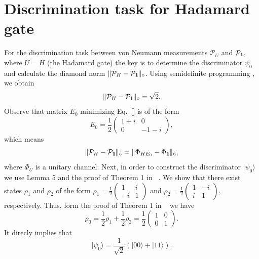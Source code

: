 \documentclass[preprint,12pt, a4paper, dvipsnames]{elsarticle}
\newcommand{\ket}[1]{\ensuremath{|#1\rangle}}
\newcommand{\1}{{\rm 1\hspace{-0.9mm}l}}
\newcommand{\Id}{{\rm 1\hspace{-0.9mm}l}}
\newcommand{\PP}{\mathcal{P}}
\begin{document}
\section{Discrimination task for Hadamard gate}\label{app:hadamard}
For the discrimination task between von Neumann measurements $\PP_{U}$ and $\PP_\Id$, where $U = H$ (the Hadamard gate) the key is to determine the discriminator $\psi_0$ and calculate the diamond norm $\| \mathcal{P}_H - \PP_\Id \|_\diamond$. 
Using semidefinite programming \cite{lewandowska2021certification, watrous2021simplier}, we obtain 
\begin{equation}
\| \mathcal{P}_H - \PP_\Id \|_\diamond = \sqrt{2}. 
\end{equation}
Observe that matrix $E_0$ minimizing Eq.~\eqref{}
is of the form
\begin{equation}
E_0 = \frac{1}{2} \left( \begin{matrix} 
1 + i & 0  \\  0 & -1-i 
\end{matrix} \right), 
\end{equation}
which means 
\begin{equation}
\| \PP_{H} - \PP_{\Id} \|_\diamond = \| \Phi_{HE_0} - \Phi_{\Id}\|_\diamond,
\end{equation}
where $\Phi_{U}$ is a unitary channel. 
Next, in order to construct the discriminator $\ket{\psi_0}$ we use Lemma 5 and the proof of Theorem 1 in ~\cite{puchala2018strategies}. We show that there exist states 
 $\rho_1 $  and $\rho_2$ of the form $ \rho_1  = \frac{1}{2} \left( \begin{matrix} 
 1  & i  \\  -i & 1
 \end{matrix} \right)  $  and $\rho_2 = \frac{1}{2} \left( \begin{matrix} 
 1 & -i \\  i & 1 
 \end{matrix} \right), $ respectively. Thus, form 
 the proof of Theorem 1 in ~\cite{puchala2018strategies} we have 
 \begin{equation}
 \rho_0 = \frac{1}{2} \rho_1 + \frac{1}{2} \rho_2 = \frac{1}{2} \left( \begin{matrix} 
 1  &  0  \\  0  & 1
 \end{matrix} \right).
 \end{equation}
 It direcly implies that 
 \begin{equation}
 \ket{\psi_0} = \frac{1}{\sqrt{2}}(\ket{00} + \ket{11}).  \end{equation}
\end{document}
